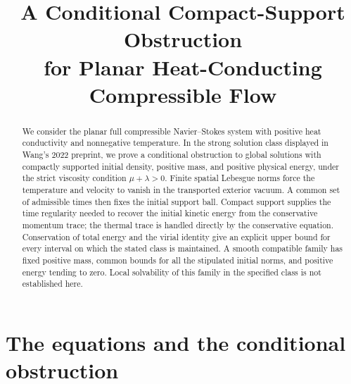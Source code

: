 \documentclass[10pt,twoside]{article}
\title{A Conditional Compact-Support Obstruction\\
for Planar Heat-Conducting Compressible Flow}
\author{}
\date{}
\begin{document}
\maketitle

\begin{abstract}
We consider the planar full compressible Navier--Stokes system with
positive heat conductivity and nonnegative temperature. In the strong
solution class displayed in Wang's 2022 preprint, we prove a conditional
obstruction to global solutions with compactly supported initial
density, positive mass, and positive physical energy, under the strict
viscosity condition $\mu+\lambda>0$. Finite spatial Lebesgue norms force
the temperature and velocity to vanish in the transported exterior
vacuum. A common set of admissible times then fixes the initial support
ball. Compact support supplies the time regularity needed to recover the
initial kinetic energy from the conservative momentum trace; the
thermal trace is handled directly by the conservative equation.
Conservation of total energy and the virial identity give an explicit
upper bound for every interval on which the stated class is maintained.
A smooth compatible family has fixed positive mass, common bounds for
all the stipulated initial norms, and positive energy tending to zero.
Local solvability of this family in the specified class is not
established here.
\end{abstract}

\section{The equations and the conditional obstruction}\label{sec:intro}
\end{document}
